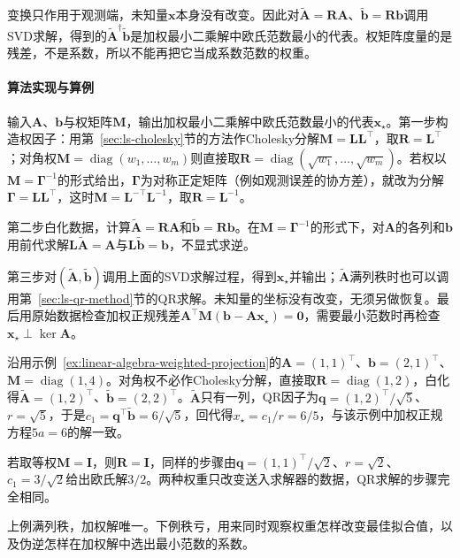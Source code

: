 变换只作用于观测端，未知量$\bm x$本身没有改变。因此对$\widetilde{\bm A}=\bm R\bm A$、$\widetilde{\bm b}=\bm R\bm b$调用SVD求解，得到的$\widetilde{\bm A}^\dagger\widetilde{\bm b}$是加权最小二乘解中欧氏范数最小的代表。权矩阵度量的是残差，不是系数，所以不能再把它当成系数范数的权重。

\paragraph{算法实现与算例}
输入$\bm A$、$\bm b$与权矩阵$\bm M$，输出加权最小二乘解中欧氏范数最小的代表$\bm x_\star$。第一步构造权因子：用第~\ref{sec:ls-cholesky}节的方法作Cholesky分解$\bm M=\bm L\bm L^\top$，取$\bm R=\bm L^\top$；对角权$\bm M=\operatorname{diag}(w_1,\ldots,w_m)$则直接取$\bm R=\operatorname{diag}(\sqrt{w_1},\ldots,\sqrt{w_m})$。若权以$\bm M=\bm\Gamma^{-1}$的形式给出，$\bm\Gamma$为对称正定矩阵（例如观测误差的协方差），就改为分解$\bm\Gamma=\bm L\bm L^\top$，这时$\bm M=\bm L^{-\top}\bm L^{-1}$，取$\bm R=\bm L^{-1}$。

第二步白化数据，计算$\widetilde{\bm A}=\bm R\bm A$和$\widetilde{\bm b}=\bm R\bm b$。在$\bm M=\bm\Gamma^{-1}$的形式下，对$\bm A$的各列和$\bm b$用前代求解$\bm L\widetilde{\bm A}=\bm A$与$\bm L\widetilde{\bm b}=\bm b$，不显式求逆。

第三步对$(\widetilde{\bm A},\widetilde{\bm b})$调用上面的SVD求解过程，得到$\bm x_\star$并输出；$\widetilde{\bm A}$满列秩时也可以调用第~\ref{sec:ls-qr-method}节的QR求解。未知量的坐标没有改变，无须另做恢复。最后用原始数据检查加权正规残差$\bm A^\top\bm M(\bm b-\bm A\bm x_\star)=\bm0$，需要最小范数时再检查$\bm x_\star\perp\ker\bm A$。

\begin{example}[两种权重下的白化求解]
\label{ex:ls-weighted-whitening-solve}
沿用示例~\ref{ex:linear-algebra-weighted-projection}的$\bm A=(1,1)^\top$、$\bm b=(2,1)^\top$、$\bm M=\operatorname{diag}(1,4)$。对角权不必作Cholesky分解，直接取$\bm R=\operatorname{diag}(1,2)$，白化得$\widetilde{\bm A}=(1,2)^\top$、$\widetilde{\bm b}=(2,2)^\top$。$\widetilde{\bm A}$只有一列，QR因子为$\bm q=(1,2)^\top/\sqrt5$、$r=\sqrt5$，于是$c_1=\bm q^\top\widetilde{\bm b}=6/\sqrt5$，回代得$x_\star=c_1/r=6/5$，与该示例中加权正规方程$5a=6$的解一致。

若取等权$\bm M=\bm I$，则$\bm R=\bm I$，同样的步骤由$\bm q=(1,1)^\top/\sqrt2$、$r=\sqrt2$、$c_1=3/\sqrt2$给出欧氏解$3/2$。两种权重只改变送入求解器的数据，QR求解的步骤完全相同。
\end{example}

上例满列秩，加权解唯一。下例秩亏，用来同时观察权重怎样改变最佳拟合值，以及伪逆怎样在加权解中选出最小范数的系数。

